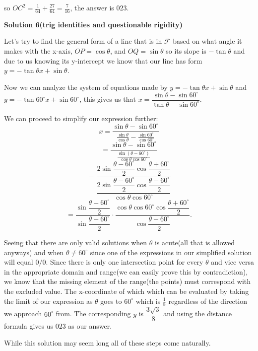 \begin{enumerate}
 so $OC^2 = \frac{1}{64} + \frac{27}{64} = \frac{7}{16}$, the answer is $\boxed{023}$.

 



\textbf{Solution 6(trig identities and questionable rigidity)}

Let's try to find the general form of a line that is in $\mathcal{F}$ based on what angle it makes with the x-axis, $OP = \cos{\theta}$, and $OQ = \sin{\theta}$ so its slope is $-\tan{\theta}$ and due to us knowing its y-intercept we know that our line has form $y = -\tan{\theta}x + \sin{\theta}.$ 

 Now we can analyze the system of equations made by $y = -\tan{\theta}x + \sin{\theta}$ and $y = -\tan{60^\circ}x + \sin{60^\circ}$, this gives us that $x = \dfrac{\sin{\theta}- \sin{60^\circ}}{\tan{\theta} - \sin{60^\circ}}.$ 

 We can proceed to simplify our expression further: 
 \[x = \dfrac{\sin{\theta} - \sin{60^\circ}}{\frac{\sin{\theta}}{\cos{\theta}} - \frac{\sin{60^\circ}}{\cos{60^\circ}}}\] 
 \[= \dfrac{\sin{\theta} - \sin{60^\circ}}{\frac{\sin{(\theta - 60^\circ)}}{\cos{\theta}\cos{60^\circ}}}\] 
 \[= \dfrac{2\sin{\dfrac{\theta - 60^\circ}{2}}\cos{\dfrac{\theta + 60^\circ}{2}}}{\dfrac{2\sin{\dfrac{\theta - 60^\circ}{2}}\cos{\dfrac{\theta - 60^\circ}{2}}}{\cos{\theta}\cos{60^\circ}}}\] 
 \[= \dfrac{\sin{\dfrac{\theta - 60^\circ}{2}}}{\sin{\dfrac{\theta - 60^\circ}{2}}} \cdot \dfrac{\cos{\theta}\cos{60^\circ}\cos{\dfrac{\theta + 60^\circ}{2}}}{\cos{\dfrac{\theta - 60^\circ}{2}}}.\]

 Seeing that there are only valid solutions when $\theta$ is acute(all that is allowed anyways) and when $\theta \neq 60^\circ$ since one of the expressions in our simplified solution will equal $0/0$. Since there is only one intersection point for every $\theta$ and vice versa in the appropriate domain and range(we can easily prove this by contradiction), we know that the missing element of the range(the points) must correspond with the excluded value. The x-coordinate of which which can be evaluated by taking the limit of our expression as $\theta$ goes to $60^\circ$ which is $\frac{1}{8}$ regardless of the direction we approach $60^\circ$ from. The corresponding $y$ is $\dfrac{3\sqrt{3}}{8}$ and using the distance formula gives us $\boxed{023}$ as our answer.

 While this solution may seem long all of these steps come naturally.

 




\end{enumerate}
